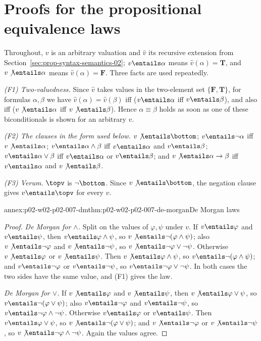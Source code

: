 \section{Proofs for the propositional equivalence laws}
\label{sec:annex-p02-w02-p02-007-equivalence-laws}

Throughout, \(v\) is an arbitrary valuation and \(\widehat v\) its recursive
extension from Section~\ref{sec:prop-syntax-semantics-02}; \(v\entails\alpha\)
means \(\widehat v(\alpha)=\mathbf T\), and \(v\not\entails\alpha\) means
\(\widehat v(\alpha)=\mathbf F\).  Three facts are used repeatedly.

\emph{(F1) Two-valuedness.}  Since \(\widehat v\) takes values in the
two-element set \(\{\mathbf F,\mathbf T\}\), for formulas \(\alpha,\beta\) we
have \(\widehat v(\alpha)=\widehat v(\beta)\) iff
(\(v\entails\alpha\) iff \(v\entails\beta\)), and also iff
(\(v\not\entails\alpha\) iff \(v\not\entails\beta\)).  Hence
\(\alpha\equiv\beta\) holds as soon as one of these biconditionals is shown
for an arbitrary \(v\).

\emph{(F2) The clauses in the form used below.}  \(v\not\entails\bottom\);
\(v\entails\neg\alpha\) iff \(v\not\entails\alpha\);
\(v\entails\alpha\land\beta\) iff \(v\entails\alpha\) and
\(v\entails\beta\); \(v\entails\alpha\lor\beta\) iff \(v\entails\alpha\) or
\(v\entails\beta\); and \(v\not\entails\alpha\to\beta\) iff
\(v\entails\alpha\) and \(v\not\entails\beta\).

\emph{(F3) Verum.}  \(\topv\) is \(\neg\bottom\).  Since
\(v\not\entails\bottom\), the negation clause gives \(v\entails\topv\) for
every \(v\).

\begin{annexitem}{annex:p02-w02-p02-007-dm}{thm:p02-w02-p02-007-de-morgan}{De Morgan laws}
\begin{proof}
\emph{De Morgan for \(\land\).}  Split on the values of \(\varphi,\psi\)
under \(v\).  If \(v\entails\varphi\) and \(v\entails\psi\), then
\(v\entails\varphi\land\psi\), so \(v\not\entails\neg(\varphi\land\psi)\);
also \(v\not\entails\neg\varphi\) and \(v\not\entails\neg\psi\), so
\(v\not\entails\neg\varphi\lor\neg\psi\).  Otherwise
\(v\not\entails\varphi\) or \(v\not\entails\psi\).  Then
\(v\not\entails\varphi\land\psi\), so \(v\entails\neg(\varphi\land\psi)\);
and \(v\entails\neg\varphi\) or \(v\entails\neg\psi\), so
\(v\entails\neg\varphi\lor\neg\psi\).  In both cases the two sides have the
same value, and (F1) gives the law.

\emph{De Morgan for \(\lor\).}  If \(v\not\entails\varphi\) and
\(v\not\entails\psi\), then \(v\not\entails\varphi\lor\psi\), so
\(v\entails\neg(\varphi\lor\psi)\); also \(v\entails\neg\varphi\) and
\(v\entails\neg\psi\), so \(v\entails\neg\varphi\land\neg\psi\).
Otherwise \(v\entails\varphi\) or \(v\entails\psi\).  Then
\(v\entails\varphi\lor\psi\), so \(v\not\entails\neg(\varphi\lor\psi)\);
and \(v\not\entails\neg\varphi\) or \(v\not\entails\neg\psi\), so
\(v\not\entails\neg\varphi\land\neg\psi\).  Again the values agree.
\end{proof}
\end{annexitem}

